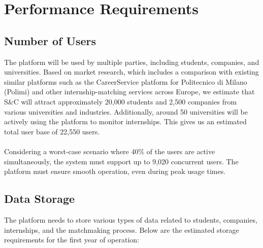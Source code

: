 \section{Performance Requirements}

\subsection{Number of Users}
The platform will be used by multiple parties, including students, companies, and universities. Based on market research, which includes a comparison with existing similar platforms such as the CareerService platform for Politecnico di Milano (Polimi) and other internship-matching services across Europe, we estimate that S\&C will attract approximately 20,000 students and 2,500 companies from various universities and industries. Additionally, around 50 universities will be actively using the platform to monitor internships. This gives us an estimated total user base of 22,550 users.\\ \\
Considering a worst-case scenario where 40\% of the users are active simultaneously, the system must support up to 9,020 concurrent users. The platform must ensure smooth operation, even during peak usage times.

\subsection{Data Storage}
The platform needs to store various types of data related to students, companies, internships, and the matchmaking process. Below are the estimated storage requirements for the first year of operation:

